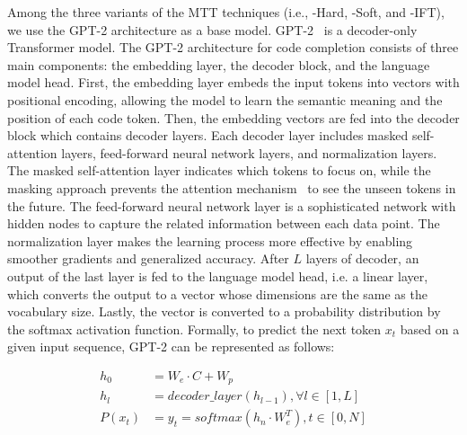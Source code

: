 Among the three variants of the MTT techniques (i.e., \our-Hard, \our-Soft, and \our-IFT), we use the GPT-2 architecture as a base model.
GPT-2~\cite{radford2019language} is a decoder-only Transformer model.
The GPT-2 architecture for code completion consists of three main components: the embedding layer, the decoder block, and the language model head. 
First, the embedding layer embeds the input tokens into vectors with positional encoding, allowing the model to learn the semantic meaning and the position of each code token.
Then, the embedding vectors are fed into the decoder block which contains decoder layers.
Each decoder layer includes masked self-attention layers, feed-forward neural network layers, and normalization layers.
The masked self-attention layer indicates which tokens to focus on, while the masking approach prevents the attention mechanism~\cite{vaswani2017attention} to see the unseen tokens in the future.
The feed-forward neural network layer is a sophisticated network with hidden nodes to capture the related information between each data point.
The normalization layer makes the learning process more effective by enabling smoother gradients and generalized accuracy.
After $L$ layers of decoder, an output of the last layer is fed to the language model head, i.e. a linear layer, which converts the output to a vector whose dimensions are the same as the vocabulary size.
Lastly, the vector is converted to a probability distribution by the softmax activation function.
Formally, to predict the next token $x_t$ based on a given input sequence, GPT-2 can be represented as follows:

\begin{equation}
\begin{aligned}
    \label{eq:transformer}
    h_0 &= W_e \cdot C + W_p \\
    h_l &= decoder\_layer(h_{l-1}), \forall l \in [1,L] \\
    P(x_t) &= y_t = softmax(h_n \cdot W^T_e), t \in [0, N]
\end{aligned}
\end{equation}


